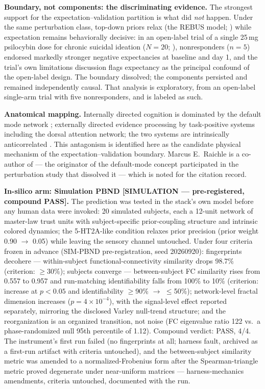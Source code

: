 \documentclass[11pt,twocolumn]{article}
\theoremstyle{plain}
\begin{document}
\textbf{Boundary, not components: the discriminating evidence.} The strongest support for the expectation--validation partition is what did \emph{not} happen. Under the same perturbation class, top-down priors relax (the REBUS model; \citealp{carhartharris2019}) while expectation remains behaviorally decisive: in an open-label trial of a single 25\,mg psilocybin dose for chronic suicidal ideation ($N = 20$; \citealp{aaronson2026}), nonresponders ($n = 5$) endorsed markedly stronger negative expectancies at baseline and day 1, and the trial's own limitations discussion flags expectancy as the principal confound of the open-label design. The boundary dissolved; the components persisted and remained independently causal. That analysis is exploratory, from an open-label single-arm trial with five nonresponders, and is labeled as such.

\textbf{Anatomical mapping.} Internally directed cognition is dominated by the default mode network \citep{raichle2001,raichle2015}; externally directed evidence processing by task-positive systems including the dorsal attention network; the two systems are intrinsically anticorrelated \citep{fox2005}. This antagonism is identified here as the candidate physical mechanism of the expectation--validation boundary. Marcus E.\ Raichle is a co-author of \citet{siegel2024} --- the originator of the default-mode concept participated in the perturbation study that dissolved it --- which is noted for the citation record.

\textbf{In-silico arm: Simulation PBND [SIMULATION --- pre-registered, compound PASS].} The prediction was tested in the stack's own model before any human data were invoked: 20 simulated subjects, each a 12-unit network of master-law trust units with subject-specific prior-coupling structure and intrinsic colored dynamics; the 5-HT2A-like condition relaxes prior precision (prior weight 0.90 $\to$ 0.05) while leaving the sensory channel untouched. Under four criteria frozen in advance (SIM-PBND pre-registration, seed 20260920): fingerprints decohere --- within-subject functional-connectivity similarity drops 98.7\% (criterion: $\geq$30\%); subjects converge --- between-subject FC similarity rises from 0.557 to 0.957 and run-matching identifiability falls from 100\% to 10\% (criterion: increase at $p<0.05$ and identifiability $\geq$90\% $\to$ $\leq$50\%); network-level fractal dimension increases ($p = 4\times10^{-4}$), with the signal-level effect reported separately, mirroring the disclosed Varley null-trend structure; and the reorganization is an organized transition, not noise (FC eigenvalue ratio 122 vs.\ a phase-randomized null 95th percentile of 1.12). Compound verdict: PASS, 4/4. The instrument's first run failed (no fingerprints at all; harness fault, archived as a first-run artifact with criteria untouched), and the between-subject similarity metric was amended to a normalized-Frobenius form after the Spearman-triangle metric proved degenerate under near-uniform matrices --- harness-mechanics amendments, criteria untouched, documented with the run.
\end{document}
